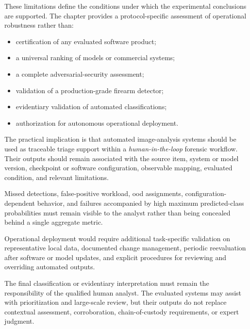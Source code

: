 These limitations define the conditions under which the experimental
conclusions are supported. The chapter provides a protocol-specific assessment
of operational robustness rather than:

\begin{itemize}
\item certification of any evaluated software product;
\item a universal ranking of models or commercial systems;
\item a complete adversarial-security assessment;
\item validation of a production-grade firearm detector;
\item evidentiary validation of automated classifications;
\item authorization for autonomous operational deployment.
\end{itemize}

The practical implication is that automated image-analysis systems should be
used as traceable triage support within a \textit{human-in-the-loop} forensic
workflow. Their outputs should remain associated with the source item, system
or model version, checkpoint or software configuration, observable mapping,
evaluated condition, and relevant limitations.

Missed detections, false-positive workload, \gls{ood} assignments,
configuration-dependent behavior, and failures accompanied by high maximum
predicted-class probabilities must remain visible to the analyst rather than
being concealed behind a single aggregate metric.

Operational deployment would require additional task-specific validation on
representative local data, documented change management, periodic reevaluation
after software or model updates, and explicit procedures for reviewing and
overriding automated outputs.

The final classification or evidentiary interpretation must remain the
responsibility of the qualified human analyst. The evaluated systems may assist
with prioritization and large-scale review, but their outputs do not replace
contextual assessment, corroboration, chain-of-custody requirements, or expert
judgment.
